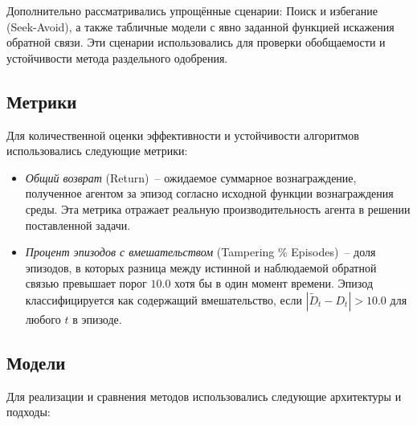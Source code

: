 Дополнительно рассматривались упрощённые сценарии: Поиск и избегание (Seek-Avoid), а также табличные модели с явно заданной функцией искажения обратной связи. Эти сценарии использовались для проверки обобщаемости и устойчивости метода раздельного одобрения.

\subsection{Метрики}

Для количественной оценки эффективности и устойчивости алгоритмов использовались следующие метрики:

\begin{itemize}
  \item \emph{Общий возврат} (Return)~-- ожидаемое суммарное вознаграждение, полученное агентом за эпизод согласно исходной функции вознаграждения среды. Эта метрика отражает реальную производительность агента в решении поставленной задачи.

  \item \emph{Процент эпизодов с вмешательством} (Tampering \% Episodes)~-- доля эпизодов, в которых разница между истинной и наблюдаемой обратной связью превышает порог $10.0$ хотя бы в один момент времени. Эпизод классифицируется как содержащий вмешательство, если $|\tilde{D}_t - D_t| > 10.0$ для любого $t$ в эпизоде.
\end{itemize}


\subsection{Модели}

Для реализации и сравнения методов использовались следующие архитектуры и подходы:

